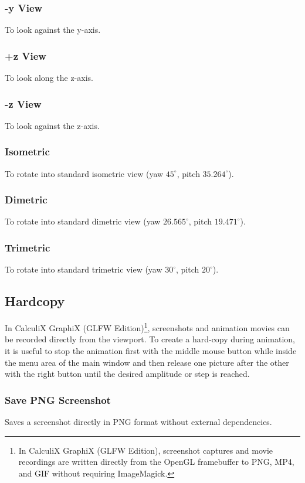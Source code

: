 \documentclass{article}
\begin{document}
\subsubsection{-y View}
To look against the y-axis.
\subsubsection{+z View}
To look along the z-axis.
\subsubsection{-z View}
To look against the z-axis.
\subsubsection{Isometric}
To rotate into standard isometric view (yaw $45^\circ$, pitch $35.264^\circ$).
\subsubsection{Dimetric}
To rotate into standard dimetric view (yaw $26.565^\circ$, pitch $19.471^\circ$).
\subsubsection{Trimetric}
To rotate into standard trimetric view (yaw $30^\circ$, pitch $20^\circ$).

\subsection{\label{Hardcopy}Hardcopy}
In CalculiX GraphiX (GLFW Edition)\footnote{In CalculiX GraphiX (GLFW Edition), screenshot captures and movie recordings are written directly from the OpenGL framebuffer to PNG, MP4, and GIF without requiring ImageMagick.}, screenshots and animation movies can be recorded directly from the viewport. To create a hard-copy during animation, it is useful to stop the animation first with the middle mouse button while inside the menu area of the main window and then release one picture after the other with the right button until the desired amplitude or step is reached.
 
\subsubsection{\label{Save PNG Screenshot}Save PNG Screenshot}
Saves a screenshot directly in PNG format without external dependencies.
\end{document}
